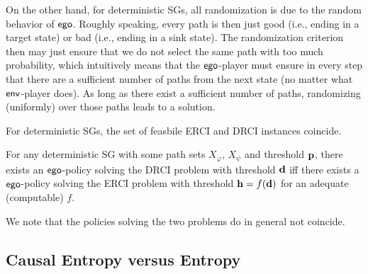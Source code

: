On the other hand, for deterministic SGs, all randomization is due to the random behavior of $\mathsf{ego}$. Roughly speaking, every path is then just good (i.e., ending in a target state) or bad (i.e., ending in a sink state). The randomization criterion then may just ensure that we do not select the same path with too much probability, which intuitively means that the $\mathsf{ego}$-player must ensure in every step that there are a sufficient number of paths from the next state (no matter what $\mathsf{env}$-player does). 
As long as there exist a sufficient number of paths, randomizing (uniformly) over those paths leads to a solution.

	For deterministic SGs, the set of feasbile ERCI and DRCI instances coincide.
\begin{theorem}
For any deterministic SG with some path sets $X_\varphi$, $X_\psi$ and threshold $\mathbf{p}$, 
there exists an $\mathsf{ego}$-policy solving the DRCI problem with threshold $\mathbf{d}$ iff there exists a $\mathsf{ego}$-policy solving the ERCI problem with threshold $\mathbf{h} = f(\mathbf{d})$ for an adequate (computable) $f$.
\end{theorem}
We note that the policies solving the two problems do in general not coincide. 

\subsection{Causal Entropy versus Entropy}

